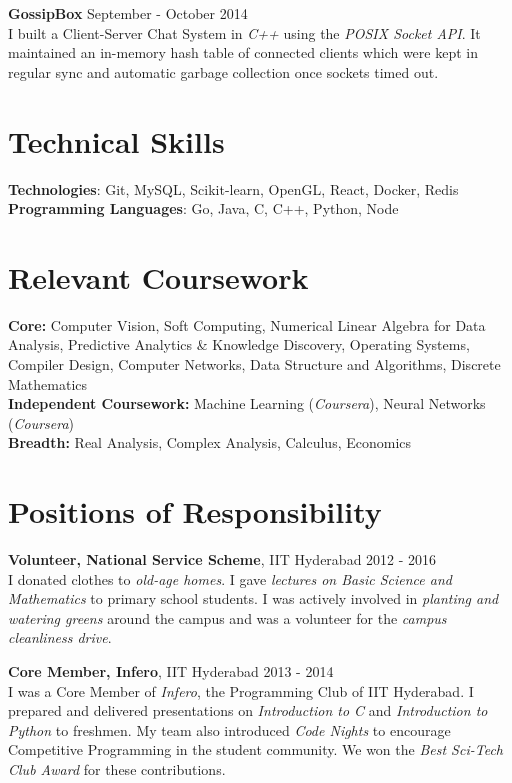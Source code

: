 \documentclass[margin,line]{res}
\begin{document}
\begin{resume}
  {\bf GossipBox} \hfill September - October 2014 \\
    I built a Client-Server Chat System in {\it C++} using the {\it POSIX Socket API}. It maintained an in-memory hash table of connected clients which were kept in regular sync and automatic garbage collection once sockets timed out.

\section{\sc Technical Skills}

  {\bf Technologies}: Git, MySQL, Scikit-learn, OpenGL, React, Docker, Redis \\
  {\bf Programming Languages}: Go, Java, C, C++, Python, Node

\section{\sc Relevant Coursework}

  {\bf Core:} Computer Vision, Soft Computing, Numerical Linear Algebra for Data Analysis, Predictive Analytics \& Knowledge Discovery, Operating Systems, Compiler Design, Computer Networks, Data Structure and Algorithms, Discrete Mathematics \\
  {\bf Independent Coursework:} Machine Learning ({\it Coursera}), Neural Networks ({\it Coursera}) \\
  {\bf Breadth:} Real Analysis, Complex Analysis, Calculus, Economics

\section{\sc Positions of Responsibility}

  {\bf Volunteer, National Service Scheme}, IIT Hyderabad \hfill 2012 - 2016 \\
    I donated clothes to {\it old-age homes}. I gave {\it lectures on Basic Science and Mathematics} to primary school students. I was actively involved in {\it planting and watering greens} around the campus and was a volunteer for the {\it campus cleanliness drive}.

  \vspace*{-2.5mm}

  {\bf Core Member, Infero}, IIT Hyderabad \hfill 2013 - 2014 \\
  	I was a Core Member of {\em Infero}, the Programming Club of IIT Hyderabad. I prepared and delivered presentations on {\em Introduction to C} and {\em Introduction to Python} to freshmen. My team also introduced {\it Code Nights} to encourage Competitive Programming in the student community. We won the {\em Best Sci-Tech Club Award} for these contributions.


\end{resume}
\end{document}
